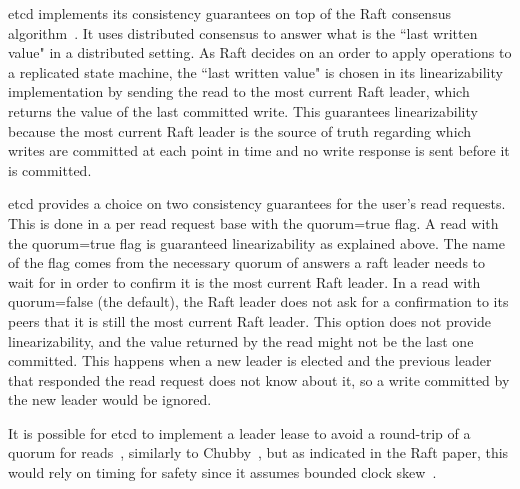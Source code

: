\documentclass[12pt,conference]{IEEEtran}
\begin{document}
etcd implements its consistency guarantees on top of the Raft consensus algorithm~\cite{ongaro2014search,etcdGithubWebsite}. It uses distributed consensus to answer what is the “last written value" in a distributed setting. As Raft decides on an order to apply operations to a replicated state machine, the “last written value" is chosen in its linearizability implementation by sending the read to the most current Raft leader, which returns the value of the last committed write. This guarantees linearizability because the most current Raft leader is the source of truth regarding which writes are committed at each point in time and no write response is sent before it is committed. 

etcd provides a choice on two consistency guarantees for the user's read requests. This is done in a per read request base with the quorum=true flag. A read with the quorum=true flag is guaranteed linearizability as explained above. The name of the flag comes from the necessary quorum of answers a raft leader needs to wait for in order to confirm it is the most current Raft leader. In a read with quorum=false (the default), the Raft leader does not ask for a confirmation to its peers that it is still the most current Raft leader. This option does not provide linearizability, and the value returned by the read might not be the last one committed. This happens when a new leader is elected and the previous leader that responded the read request does not know about it, so a write committed by the new leader would be ignored. 

It is possible for etcd to implement a leader lease to avoid a round-trip of a quorum for reads~\cite{gray1989leases}, similarly to Chubby~\cite{burrows2006chubby}, but as indicated in the Raft paper, this would rely on timing for safety since it assumes bounded clock skew~\cite{ongaro2014search}.




%
%
\end{document}
